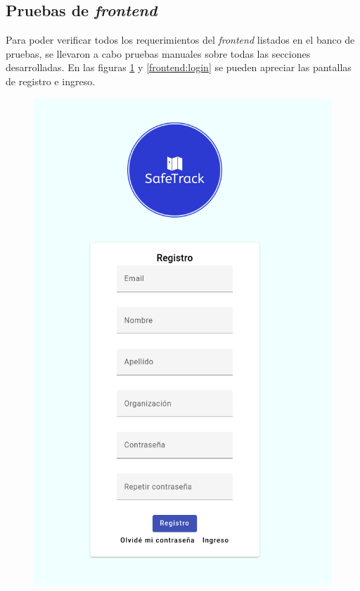 \subsection{Pruebas de \textit{frontend}}

Para poder verificar todos los requerimientos del \textit{frontend} listados en el banco de pruebas, se llevaron a cabo pruebas manuales sobre todas las secciones desarrolladas. En las figuras \ref{frontend:registro} y \ref{frontend:login} se pueden apreciar las pantallas de registro e ingreso.


\begin{figure}[H]
\centering
\begin{minipage}{.5\textwidth}
  \centering
  \includegraphics[width=0.9\linewidth]{./Figures/registro.png}
  \label{frontend:registro}

\end{minipage}
\end{figure}
